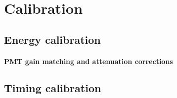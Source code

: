 \section{Calibration}

\subsection{Energy calibration}
\paragraph{PMT gain matching and attenuation corrections}

\subsection{Timing calibration}




